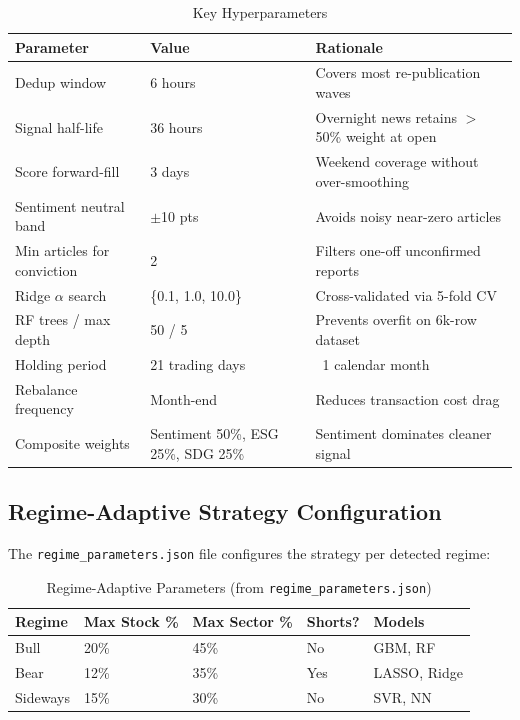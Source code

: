 \documentclass[12pt, a4paper]{article}
\begin{document}
\begin{table}[H]
\centering
\caption{Key Hyperparameters}
\renewcommand{\arraystretch}{1.3}
\begin{tabular}{@{}lll@{}}
\toprule
\textbf{Parameter} & \textbf{Value} & \textbf{Rationale} \\ \midrule
Dedup window          & 6 hours         & Covers most re-publication waves \\
Signal half-life      & 36 hours        & Overnight news retains $>$50\% weight at open \\
Score forward-fill    & 3 days          & Weekend coverage without over-smoothing \\
Sentiment neutral band & $\pm$10 pts    & Avoids noisy near-zero articles \\
Min articles for conviction & 2         & Filters one-off unconfirmed reports \\
Ridge $\alpha$ search & \{0.1, 1.0, 10.0\} & Cross-validated via 5-fold CV \\
RF trees / max depth  & 50 / 5         & Prevents overfit on 6k-row dataset \\
Holding period        & 21 trading days & ~1 calendar month \\
Rebalance frequency   & Month-end       & Reduces transaction cost drag \\
Composite weights     & Sentiment 50\%, ESG 25\%, SDG 25\% & Sentiment dominates cleaner signal \\
\bottomrule
\end{tabular}
\end{table}

\subsection{Regime-Adaptive Strategy Configuration}

The \texttt{regime\_parameters.json} file configures the strategy per detected regime:

\begin{table}[H]
\centering
\caption{Regime-Adaptive Parameters (from \texttt{regime\_parameters.json})}
\renewcommand{\arraystretch}{1.3}
\begin{tabular}{@{}lllll@{}}
\toprule
\textbf{Regime} & \textbf{Max Stock \%} & \textbf{Max Sector \%} & \textbf{Shorts?} & \textbf{Models} \\ \midrule
Bull     & 20\% & 45\% & No  & GBM, RF \\
Bear     & 12\% & 35\% & Yes & LASSO, Ridge \\
Sideways & 15\% & 30\% & No  & SVR, NN \\
\bottomrule
\end{tabular}
\end{table}
\end{document}
